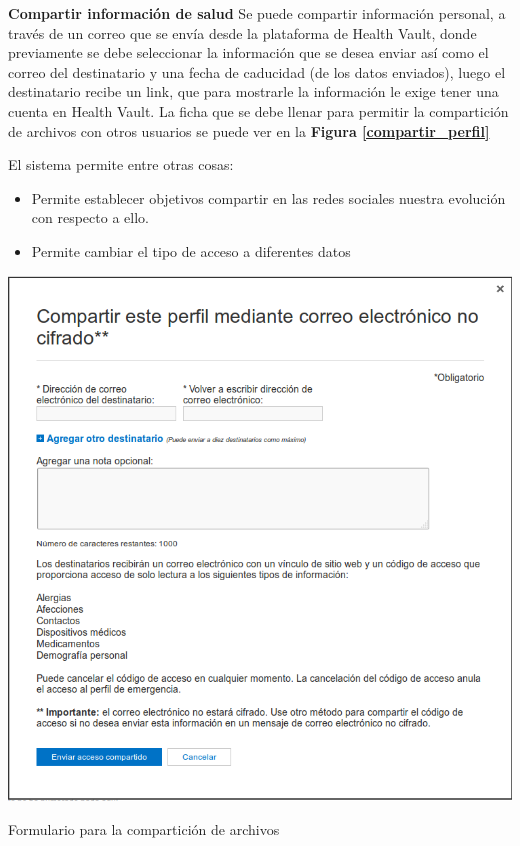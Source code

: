 \begin{itemize}
{\item \textbf{Compartir información de salud}
	Se puede compartir información personal, a través de un correo que se envía desde la plataforma de Health Vault, donde previamente se debe seleccionar la información que se desea enviar así como el correo del destinatario y una fecha de caducidad (de los datos enviados), luego el destinatario recibe un link, que para mostrarle la información le exige tener una cuenta en Health Vault. La ficha que se debe llenar para permitir la compartición de archivos con otros usuarios se puede ver en la \textbf{Figura \ref{compartir_perfil}}
    
    El sistema permite entre otras cosas:
    \begin{itemize}
		\item Permite establecer objetivos compartir en las redes sociales nuestra evolución con respecto a ello.
        \item Permite cambiar el tipo de acceso a diferentes datos

	\end{itemize}
	\begin{correccionFigure} 
      \centering
      \includegraphics[width=.8\textwidth]{img/tp1/3-compartir_perfil}
      \caption{Formulario para la compartición de archivos}
      \label{compartir_perfil}
    \end{correccionFigure} 
    
}
\end{itemize}
